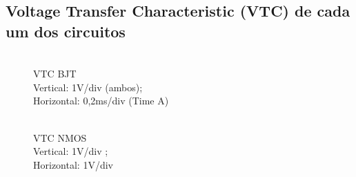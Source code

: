 \documentclass[pdftex,12pt,a4paper]{report}
\begin{document}
\subsection{Voltage Transfer Characteristic (VTC) de cada um dos circuitos}
\begin{figure}[!htb]
  \centerline{}
  \caption{\\VTC BJT \\Vertical: 1V/div (ambos); \\Horizontal: 0,2ms/div (Time A)}\label{bjt}
\endminipage\hfill
{}
  \centerline{}
  \caption{\\VTC NMOS \\Vertical: 1V/div ; \\Horizontal: 1V/div }\label{fig:nmos}
\endminipage\hfill
\end{figure}
\end{document}
